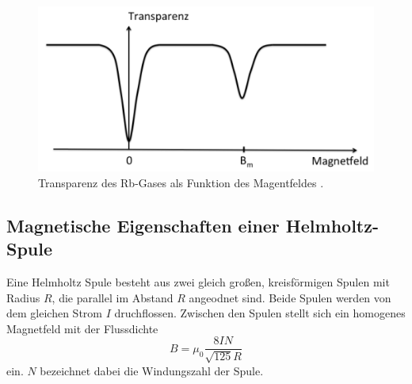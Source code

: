 \begin{figure}[H]
    \centering
    \includegraphics[scale= 0.5]{pictures/TB.png}
    \caption{Transparenz des Rb-Gases als Funktion des Magentfeldes \cite{V21}.}
    \label{fig:TB}
\end{figure}

\subsection{Magnetische Eigenschaften einer Helmholtz-Spule}
Eine Helmholtz Spule besteht aus zwei gleich großen, kreisförmigen 
Spulen mit Radius $R$, die parallel im Abstand $R$ angeodnet sind. 
Beide Spulen werden von dem gleichen Strom $I$ druchflossen. Zwischen 
den Spulen stellt sich ein homogenes Magnetfeld mit der Flussdichte
\begin{equation}
    B=\mu_0\frac{8IN}{\sqrt{125}R}
\end{equation}
ein. $N$ bezeichnet dabei die Windungszahl der Spule. 